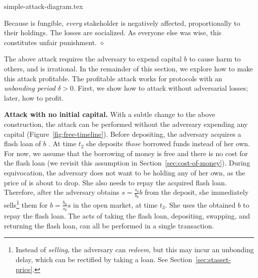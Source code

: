 \iflncs
  {simple-attack-diagram.tex}
\fi

Because \stasset is fungible, \emph{every} stakeholder is negatively affected,
proportionally to their holdings.
The losses are socialized. As everyone else was
wise, this constitutes unfair punishment.
\hfill
$\diamond$


The above attack requires the adversary to expend capital $b$ to cause
harm to others, and is irrational. In the remainder of this section, we
explore how to make this attack profitable. The profitable attack works
for protocols with an \emph{unbonding period} $\delta > 0$. First, we show
how to attack without adversarial losses; later, how to profit.

\noindent
\textbf{Attack with no initial capital.}
With a subtle change to the above construction, the attack can be
performed without the adversary expending any capital (Figure~\ref{fig:free-timeline}).
Before depositing, the
adversary acquires a flash loan of $b$ \asset. At time $t_2$ she deposits \emph{those}
borrowed funds instead of her own.
For now, we assume that the borrowing of money is free
and there is no cost for the flash loan
(we revisit this assumption in Section~\ref{sec:cost-of-money}).
During equivocation, the adversary does not want to be holding any
\stasset of her own, as the price of \stasset is about to drop. She also
needs to repay the acquired flash loan.
Therefore, after the adversary obtains $s = \frac{s_0}{b_0} b$ \stasset
from the deposit, she immediately sells\footnote{Instead of \emph{selling}, the
adversary can \emph{redeem}, but this may incur an unbonding delay, which can
be rectified by taking a loan.  See Section~\ref{sec:stasset-price}.} them
for $b = \frac{b_0}{s_0} s$ \asset in the open market, at time $t_3$.
She uses the obtained $b$ \asset to
repay the flash loan.
The acts of taking the flash loan,
depositing, swapping, and returning the flash loan,
can all be performed in a single transaction.

